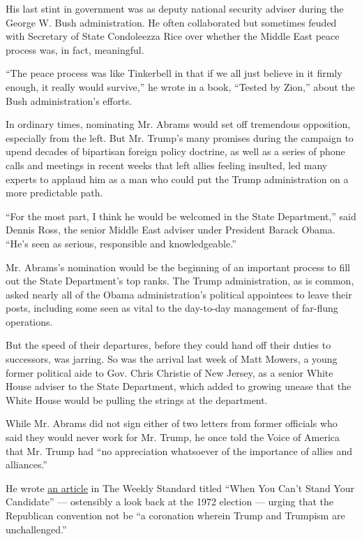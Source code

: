 His last stint in government was as deputy national security adviser
during the George W. Bush administration. He often collaborated but
sometimes feuded with Secretary of State Condoleezza Rice over whether
the Middle East peace process was, in fact, meaningful.

``The peace process was like Tinkerbell in that if we all just believe
in it firmly enough, it really would survive,'' he wrote in a book,
``Tested by Zion,'' about the Bush administration's efforts.

In ordinary times, nominating Mr. Abrams would set off tremendous
opposition, especially from the left. But Mr. Trump's many promises
during the campaign to upend decades of bipartisan foreign policy
doctrine, as well as a series of phone calls and meetings in recent
weeks that left allies feeling insulted, led many experts to applaud him
as a man who could put the Trump administration on a more predictable
path.

``For the most part, I think he would be welcomed in the State
Department,'' said Dennis Ross, the senior Middle East adviser under
President Barack Obama. ``He's seen as serious, responsible and
knowledgeable.''

Mr. Abrams's nomination would be the beginning of an important process
to fill out the State Department's top ranks. The Trump administration,
as is common, asked nearly all of the Obama administration's political
appointees to leave their posts, including some seen as vital to the
day-to-day management of far-flung operations.

But the speed of their departures, before they could hand off their
duties to successors, was jarring. So was the arrival last week of Matt
Mowers, a young former political aide to Gov. Chris Christie of New
Jersey, as a senior White House adviser to the State Department, which
added to growing unease that the White House would be pulling the
strings at the department.

While Mr. Abrams did not sign either of two letters from former
officials who said they would never work for Mr. Trump, he once told the
Voice of America that Mr. Trump had ``no appreciation whatsoever of the
importance of allies and alliances.''

He wrote
\href{http://www.weeklystandard.com/when-you-cant-stand-your-candidate/article/2002283}{an
article} in The Weekly Standard titled ``When You Can't Stand Your
Candidate'' --- ostensibly a look back at the 1972 election --- urging
that the Republican convention not be ``a coronation wherein Trump and
Trumpism are unchallenged.''

